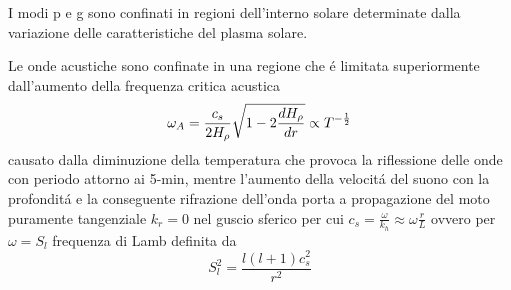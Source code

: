 \documentclass[../main.tex]{subfiles}
\begin{document}
I modi p e g sono confinati in regioni dell'interno solare determinate dalla variazione delle caratteristiche del plasma solare.

\begin{minipage}{\linewidth}
\end{minipage}

Le onde acustiche sono confinate in una regione che \'e limitata superiormente dall'aumento della frequenza critica acustica
\begin{equation}
\omega_A=\frac{c_s}{2H_{\rho}{}}\sqrt{1-2\frac{d H_{\rho}{}}{d r}}\propto T^{-\frac{1}{2}}\label{eq:acusticcutoff}
\end{equation}
causato dalla diminuzione della temperatura che provoca la riflessione delle onde con periodo attorno ai 5-min, mentre l'aumento della velocit\'a del suono con la profondit\'a e la conseguente rifrazione dell'onda porta a propagazione del moto puramente tangenziale $k_r=0$ nel guscio sferico per cui $c_s=\frac{\omega}{k_h}\approx\omega \frac{r}{L}$ ovvero per $\omega=S_l$ frequenza di Lamb definita da
\begin{equation}
S_l^2=\frac{l(l+1)c_s^2}{r^2}\label{eq:Lambf}
\end{equation}
\end{document}

